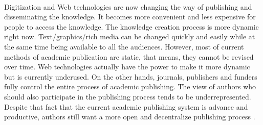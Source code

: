 \documentclass[openany,12pt]{ecsthesis}      %
\begin{document}
\paragraph{}Digitization and Web technologies are now changing the way of publishing and disseminating the knowledge.
It becomes more convenient and less expensive for people to access the knowledge. 
The knowledge creation process is more dynamic right now. 
Text/graphics/rich media can be changed quickly and easily while at the same time being available to all the audiences.
However, most of current methods of academic publication are static, that means, they cannot be revised over time\cite{heller2014dynamic}. 
Web technologies actually have the power to make it more dynamic but is currently underused. On the other hands, journals, publishers and funders fully control
the entire process of academic publishing. The view of authors who should also participate in the publishing process tends to be underrepresented. 
Despite that fact that the current academic publishing system is advance and productive, 
authors still want a more open and decentralize publishing process \cite{d2018authors}.
\end{document}
